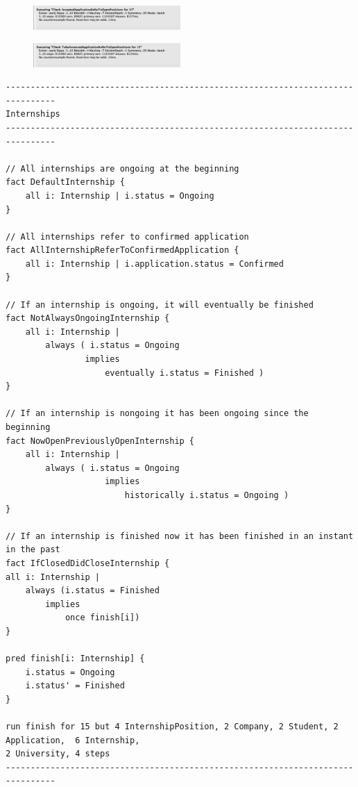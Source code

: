 \begin{figure}[h!]
    \centering\includegraphics[width=0.5\textwidth]{RASD/Images/Alloy/checkAcceptedApplicationReferToOpenPositions.png}
    \label{fig:checkAcceptedApplicationReferToOpenPositions}
\end{figure}
\begin{figure}[h!]
    \centering\includegraphics[width=0.5\textwidth]{RASD/Images/Alloy/checkTobeAssessedApplicationReferToOpenPositions.png}
    \label{fig:TobeAssessedApplicationReferToOpenPositions}
\end{figure}

\begin{verbatim}
--------------------------------------------------------------------------------
Internships
--------------------------------------------------------------------------------

// All internships are ongoing at the beginning
fact DefaultInternship {
    all i: Internship | i.status = Ongoing
}

// All internships refer to confirmed application 
fact AllInternshipReferToConfirmedApplication {
    all i: Internship | i.application.status = Confirmed
}

// If an internship is ongoing, it will eventually be finished
fact NotAlwaysOngoingInternship {
    all i: Internship | 
        always ( i.status = Ongoing
                implies 
                    eventually i.status = Finished )
}

// If an internship is nongoing it has been ongoing since the beginning
fact NowOpenPreviouslyOpenInternship {
    all i: Internship | 
        always ( i.status = Ongoing
                    implies 
                        historically i.status = Ongoing )
}

// If an internship is finished now it has been finished in an instant in the past
fact IfClosedDidCloseInternship {
all i: Internship |
    always (i.status = Finished
        implies 
            once finish[i])
}

pred finish[i: Internship] {
    i.status = Ongoing
    i.status' = Finished
}

run finish for 15 but 4 InternshipPosition, 2 Company, 2 Student, 2 Application,  6 Internship,
2 University, 4 steps
--------------------------------------------------------------------------------
\end{verbatim}

